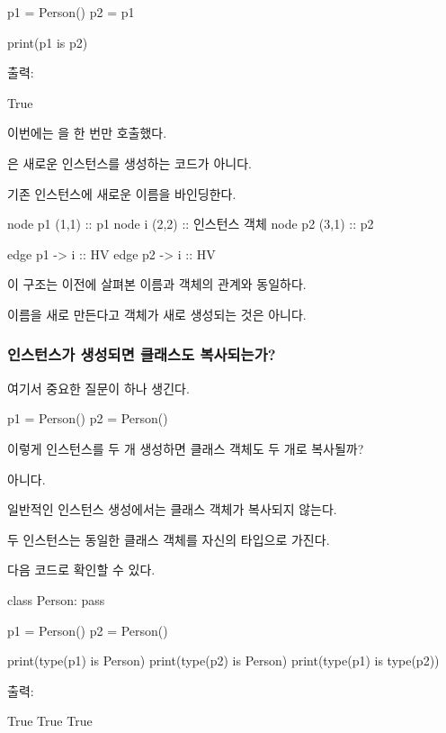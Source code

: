 \begin{dhkcode}
p1 = Person()
p2 = p1

print(p1 is p2)
\end{dhkcode}

출력:

\begin{dhkzsh}
True
\end{dhkzsh}

이번에는 을 한 번만 호출했다.

은 새로운 인스턴스를 생성하는 코드가 아니다.

기존 인스턴스에 새로운 이름을 바인딩한다.

\begin{dhkdiagram}[in=6]
node p1 (1,1) :: p1
node i (2,2) :: 인스턴스 객체
node p2 (3,1) :: p2

edge p1 -> i :: HV
edge p2 -> i :: HV
\end{dhkdiagram}

이 구조는 이전에 살펴본 이름과 객체의 관계와 동일하다.

이름을 새로 만든다고 객체가 새로 생성되는 것은 아니다.

\subsubsection{인스턴스가 생성되면 클래스도 복사되는가?}

여기서 중요한 질문이 하나 생긴다.

\begin{dhkcode}
p1 = Person()
p2 = Person()
\end{dhkcode}

이렇게 인스턴스를 두 개 생성하면  클래스 객체도 두 개로 복사될까?

아니다.

일반적인 인스턴스 생성에서는 클래스 객체가 복사되지 않는다.

두 인스턴스는 동일한 클래스 객체를 자신의 타입으로 가진다.

다음 코드로 확인할 수 있다.

\begin{dhkcode}
class Person:
    pass

p1 = Person()
p2 = Person()

print(type(p1) is Person)
print(type(p2) is Person)
print(type(p1) is type(p2))
\end{dhkcode}

출력:
\begin{dhkzsh}
True
True
True
\end{dhkzsh}

